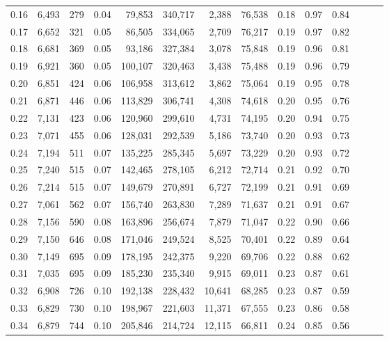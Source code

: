 \begin{tabular}{rrrrrrrrrrrrrr}
0.16 &  6,493 &    279 &  0.04 &   79,853 &  340,717 &   2,388 &  76,538 &  0.18 &  0.97 &      0.84 \\
0.17 &  6,652 &    321 &  0.05 &   86,505 &  334,065 &   2,709 &  76,217 &  0.19 &  0.97 &      0.82 \\
0.18 &  6,681 &    369 &  0.05 &   93,186 &  327,384 &   3,078 &  75,848 &  0.19 &  0.96 &      0.81 \\
0.19 &  6,921 &    360 &  0.05 &  100,107 &  320,463 &   3,438 &  75,488 &  0.19 &  0.96 &      0.79 \\
0.20 &  6,851 &    424 &  0.06 &  106,958 &  313,612 &   3,862 &  75,064 &  0.19 &  0.95 &      0.78 \\
0.21 &  6,871 &    446 &  0.06 &  113,829 &  306,741 &   4,308 &  74,618 &  0.20 &  0.95 &      0.76 \\
0.22 &  7,131 &    423 &  0.06 &  120,960 &  299,610 &   4,731 &  74,195 &  0.20 &  0.94 &      0.75 \\
0.23 &  7,071 &    455 &  0.06 &  128,031 &  292,539 &   5,186 &  73,740 &  0.20 &  0.93 &      0.73 \\
0.24 &  7,194 &    511 &  0.07 &  135,225 &  285,345 &   5,697 &  73,229 &  0.20 &  0.93 &      0.72 \\
0.25 &  7,240 &    515 &  0.07 &  142,465 &  278,105 &   6,212 &  72,714 &  0.21 &  0.92 &      0.70 \\
0.26 &  7,214 &    515 &  0.07 &  149,679 &  270,891 &   6,727 &  72,199 &  0.21 &  0.91 &      0.69 \\
0.27 &  7,061 &    562 &  0.07 &  156,740 &  263,830 &   7,289 &  71,637 &  0.21 &  0.91 &      0.67 \\
0.28 &  7,156 &    590 &  0.08 &  163,896 &  256,674 &   7,879 &  71,047 &  0.22 &  0.90 &      0.66 \\
0.29 &  7,150 &    646 &  0.08 &  171,046 &  249,524 &   8,525 &  70,401 &  0.22 &  0.89 &      0.64 \\
0.30 &  7,149 &    695 &  0.09 &  178,195 &  242,375 &   9,220 &  69,706 &  0.22 &  0.88 &      0.62 \\
0.31 &  7,035 &    695 &  0.09 &  185,230 &  235,340 &   9,915 &  69,011 &  0.23 &  0.87 &      0.61 \\
0.32 &  6,908 &    726 &  0.10 &  192,138 &  228,432 &  10,641 &  68,285 &  0.23 &  0.87 &      0.59 \\
0.33 &  6,829 &    730 &  0.10 &  198,967 &  221,603 &  11,371 &  67,555 &  0.23 &  0.86 &      0.58 \\
0.34 &  6,879 &    744 &  0.10 &  205,846 &  214,724 &  12,115 &  66,811 &  0.24 &  0.85 &      0.56 \\

\end{tabular}
